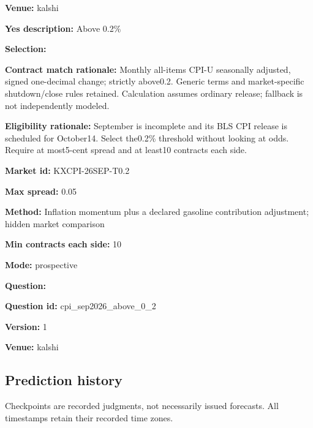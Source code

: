 \documentclass[11pt]{article}
\begin{document}
\par\noindent\textbf{Venue:} kalshi

\par\noindent\textbf{Yes description:} Above 0.2\%

\par\noindent\textbf{Selection:} \par \par\noindent\textbf{Contract match rationale:} Monthly all-items CPI-U seasonally adjusted, signed one-decimal change; strictly above0.2. Generic terms and market-specific shutdown/close rules retained. Calculation assumes ordinary release; fallback is not independently modeled.

\par\noindent\textbf{Eligibility rationale:} September is incomplete and its BLS CPI release is scheduled for October14. Select the0.2\% threshold without looking at odds. Require at most5-cent spread and at least10 contracts each side.

\par\noindent\textbf{Market id:} KXCPI-26SEP-T0.2

\par\noindent\textbf{Max spread:} 0.05

\par\noindent\textbf{Method:} Inflation momentum plus a declared gasoline contribution adjustment; hidden market comparison

\par\noindent\textbf{Min contracts each side:} 10

\par\noindent\textbf{Mode:} prospective

\par\noindent\textbf{Question:} \par \par\noindent\textbf{Question id:} cpi\_sep2026\_above\_0\_2

\par\noindent\textbf{Version:} 1

\par\noindent\textbf{Venue:} kalshi

\subsection*{\textcolor{epdarkgreen}{Prediction history}}
Checkpoints are recorded judgments, not necessarily issued forecasts. All timestamps retain their recorded time zones.
\end{document}
